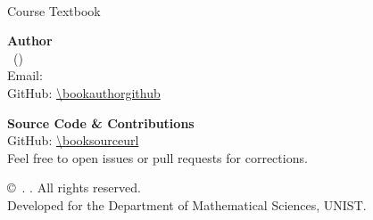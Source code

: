 \begin{flushleft}
    \vfill
    
    {\large \textbf{\bookdisplaytitle}} \\[0.2cm]
    {\small Course Textbook} \\

    \vspace{2cm}

    \textbf{Author} \\
    \bookauthorname\ (\emph{\bookauthoraffiliation}) \\
    Email: \href{mailto:\bookauthoremail}{\texttt{\bookauthoremail}} \\
    GitHub: \url{\bookauthorgithub} \\

    \vspace{1cm}

    \textbf{Source Code \& Contributions} \\
    GitHub: \url{\booksourceurl} \\
    \footnotesize{Feel free to open issues or pull requests for corrections.} \\

    \vspace{1cm}

    \copyright\ \bookcopyrightyear. \bookauthorname. All rights reserved. \\
    \small{Developed for the Department of Mathematical Sciences, UNIST.} \\

    \vspace{0.4cm}
    
    \footnotesize{\booklicense}
\end{flushleft}
